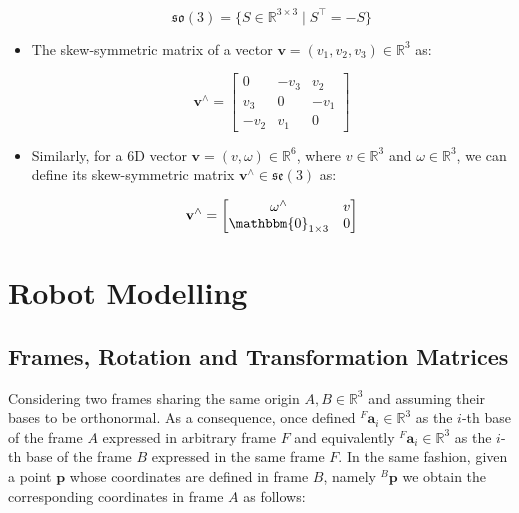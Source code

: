 \begin{itemize}
          \begin{equation}
              \mathfrak{so}(3) = \{S \in \mathbb{R}^{3\times3} \mid S^\top = -S \}
          \end{equation}

    \item The skew-symmetric matrix of a vector $\mathbf{v} = (v_1, v_2, v_3) \in \mathbb{R}^3$ as:

          \begin{equation}
              \mathbf{v} ^\wedge = \begin{bmatrix}
                  0    & -v_3 & v_2  \\
                  v_3  & 0    & -v_1 \\
                  -v_2 & v_1  & 0
              \end{bmatrix}
          \end{equation}

    \item Similarly, for a $6$D vector $\mathbf{v} = (v, \omega) \in \mathbb{R}^6$, where $v \in \mathbb{R}^3$ and $\omega \in \mathbb{R}^3$, we can define its skew-symmetric matrix $\mathbf{v} ^\wedge \in \mathfrak{se}(3)$ as:

          \begin{equation}
              \mathbf{v} ^\wedge = \begin{bmatrix}
                  \omega ^\wedge            & v \\
                  \mathbbm{0} _{1 \times 3} & 0
              \end{bmatrix}
          \end{equation}
\end{itemize}

\section{Robot Modelling}

\subsection{Frames, Rotation and Transformation Matrices}

Considering two frames sharing the same origin $A, B \in \mathbb{R}^3$ and assuming their bases to be orthonormal. As a consequence, once defined ${}^F\mathbf{a} _i \in \mathbb{R}^3$ as the $i$-th base of the frame $A$ expressed in arbitrary frame $F$ and equivalently ${}^F\mathbf{a} _i \in \mathbb{R}^3$ as the $i$-th base of the frame $B$ expressed in the same frame $F$. In the same fashion, given a point $\mathbf{p}$ whose coordinates are defined in frame $B$, namely ${}^B\mathbf{p}$ we obtain the corresponding coordinates in frame $A$ as follows:

